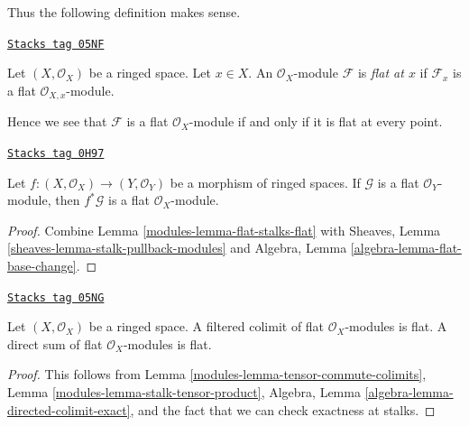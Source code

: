 Thus the following definition makes sense.

\begin{definition}
\label{modules-definition-flat-at-point}
\href{https://stacks.math.columbia.edu/tag/05NF}{\texttt{Stacks tag 05NF}}

Let $(X, \mathcal{O}_X)$ be a ringed space. Let $x \in X$.
An $\mathcal{O}_X$-module $\mathcal{F}$ is
{\it flat at $x$} if $\mathcal{F}_x$ is a flat
$\mathcal{O}_{X, x}$-module.
\end{definition}

Hence we see that $\mathcal{F}$ is a flat $\mathcal{O}_X$-module
if and only if it is flat at every point.

\begin{lemma}
\label{modules-lemma-base-change-flat}
\href{https://stacks.math.columbia.edu/tag/0H97}{\texttt{Stacks tag 0H97}}

Let $f : (X, \mathcal{O}_X) \to (Y, \mathcal{O}_Y)$
be a morphism of ringed spaces. If $\mathcal{G}$ is a flat
$\mathcal{O}_Y$-module, then $f^*\mathcal{G}$ is a flat
$\mathcal{O}_X$-module.
\end{lemma}

\begin{proof}

Combine Lemma \ref{modules-lemma-flat-stalks-flat} with
Sheaves, Lemma \ref{sheaves-lemma-stalk-pullback-modules} and
Algebra, Lemma \ref{algebra-lemma-flat-base-change}.
\end{proof}

\begin{lemma}
\label{modules-lemma-colimits-flat}
\href{https://stacks.math.columbia.edu/tag/05NG}{\texttt{Stacks tag 05NG}}

Let $(X, \mathcal{O}_X)$ be a ringed space.
A filtered colimit of flat $\mathcal{O}_X$-modules is flat.
A direct sum of flat $\mathcal{O}_X$-modules is flat.
\end{lemma}

\begin{proof}

This follows from
Lemma \ref{modules-lemma-tensor-commute-colimits},
Lemma \ref{modules-lemma-stalk-tensor-product},
Algebra, Lemma \ref{algebra-lemma-directed-colimit-exact},
and the fact that we can check exactness at stalks.
\end{proof}

